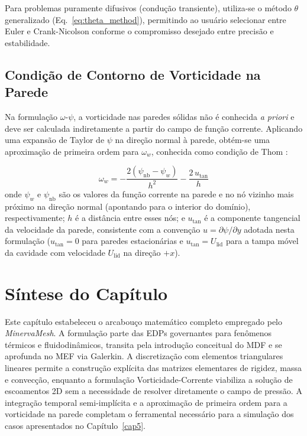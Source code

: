 Para problemas puramente difusivos (condução transiente), utiliza-se o método $\theta$ generalizado (Eq.~\ref{eq:theta_method}), permitindo ao usuário selecionar entre Euler e Crank-Nicolson conforme o compromisso desejado entre precisão e estabilidade.

\subsection{Condição de Contorno de Vorticidade na Parede}
\label{sec:thom}

Na formulação $\omega$-$\psi$, a vorticidade nas paredes sólidas não é conhecida \textit{a priori} e deve ser calculada indiretamente a partir do campo de função corrente. Aplicando uma expansão de Taylor de $\psi$ na direção normal à parede, obtém-se uma aproximação de primeira ordem para $\omega_w$, conhecida como condição de Thom \cite{Thom1933}:

\begin{equation}
\omega_w = -\frac{2(\psi_{\text{nb}} - \psi_w)}{h^2} - \frac{2 \, u_{\text{tan}}}{h}
\label{eq:thom}
\end{equation}
onde $\psi_w$ e $\psi_{\text{nb}}$ são os valores da função corrente na parede e no nó vizinho mais próximo na direção normal (apontando para o interior do domínio), respectivamente; $h$ é a distância entre esses nós; e $u_{\text{tan}}$ é a componente tangencial da velocidade da parede, consistente com a convenção $u = \partial\psi/\partial y$ adotada nesta formulação ($u_{\text{tan}} = 0$ para paredes estacionárias e $u_{\text{tan}} = U_{\text{lid}}$ para a tampa móvel da cavidade com velocidade $U_{\text{lid}}$ na direção $+x$).

\section{Síntese do Capítulo}
\label{sec:sintese_fundamentacao}

Este capítulo estabeleceu o arcabouço matemático completo empregado pelo \textit{MinervaMesh}. A formulação parte das EDPs governantes para fenômenos térmicos e fluidodinâmicos, transita pela introdução conceitual do MDF e se aprofunda no MEF via Galerkin. A discretização com elementos triangulares lineares permite a construção explícita das matrizes elementares de rigidez, massa e convecção, enquanto a formulação Vorticidade-Corrente viabiliza a solução de escoamentos 2D sem a necessidade de resolver diretamente o campo de pressão. A integração temporal semi-implícita e a aproximação de primeira ordem para a vorticidade na parede completam o ferramental necessário para a simulação dos casos apresentados no Capítulo~\ref{cap5}.
